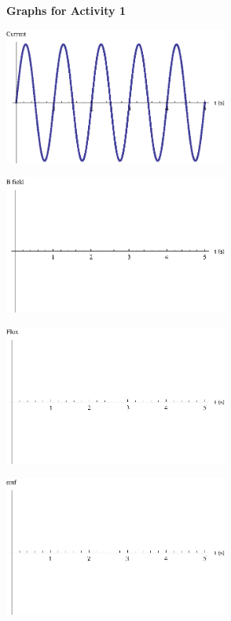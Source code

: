 \begin{center}

{\bf Graphs for Activity 1}

\vfil

\includegraphics[width=2.9in]{induction2/indfig1.eps}

\includegraphics[width=2.9in]{induction2/indfig2.eps}

\includegraphics[width=2.9in]{induction2/indfig3.eps}

\includegraphics[width=2.9in]{induction2/indfig4.eps}



\vfil

\end{center}


